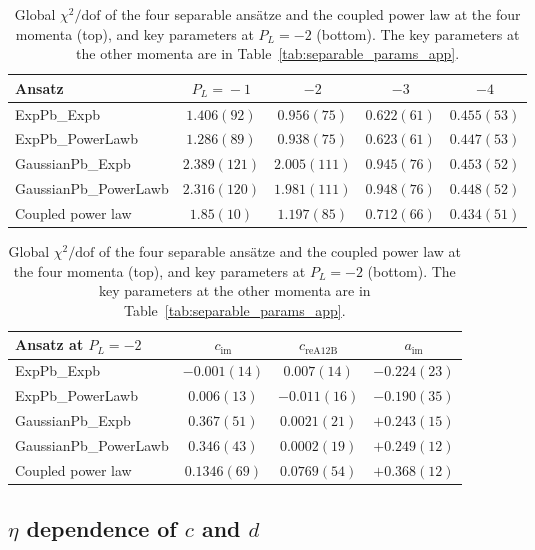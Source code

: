 \begin{table}
\caption{Global $\chi^2/\text{dof}$ of the four separable ansätze and the coupled power law at the four momenta (top), and key parameters at $P_L=-2$ (bottom). The key parameters at the other momenta are in Table~\ref{tab:separable_params_app}.}
\label{tab:separable}
\scriptsize
\setlength{\tabcolsep}{2pt}
\begin{ruledtabular}
\begin{tabular}{lcccc}
Ansatz & $P_L\!=\!-1$ & $-2$ & $-3$ & $-4$ \\
\hline
ExpPb\_Expb & $1.406(92)$ & $0.956(75)$ & $0.622(61)$ & $0.455(53)$ \\
ExpPb\_PowerLawb & $1.286(89)$ & $0.938(75)$ & $0.623(61)$ & $0.447(53)$ \\
GaussianPb\_Expb & $2.389(121)$ & $2.005(111)$ & $0.945(76)$ & $0.453(52)$ \\
GaussianPb\_PowerLawb & $2.316(120)$ & $1.981(111)$ & $0.948(76)$ & $0.448(52)$ \\
Coupled power law & $1.85(10)$ & $1.197(85)$ & $0.712(66)$ & $0.434(51)$ \\
\end{tabular}
\end{ruledtabular}
\medskip

\scriptsize
\begin{ruledtabular}
\begin{tabular}{lccc}
Ansatz at $P_L=-2$ & $c_{\text{im}}$ & $c_{\text{reA12B}}$ & $a_{\text{im}}$ \\
\hline
ExpPb\_Expb & $-0.001(14)$ & $0.007(14)$ & $-0.224(23)$ \\
ExpPb\_PowerLawb & $0.006(13)$ & $-0.011(16)$ & $-0.190(35)$ \\
GaussianPb\_Expb & $0.367(51)$ & $0.0021(21)$ & $+0.243(15)$ \\
GaussianPb\_PowerLawb & $0.346(43)$ & $0.0002(19)$ & $+0.249(12)$ \\
Coupled power law & $0.1346(69)$ & $0.0769(54)$ & $+0.368(12)$ \\
\end{tabular}
\end{ruledtabular}
\end{table}

\subsection{$\eta$ dependence of $c$ and $d$}
\label{sec:eta_dependence}

